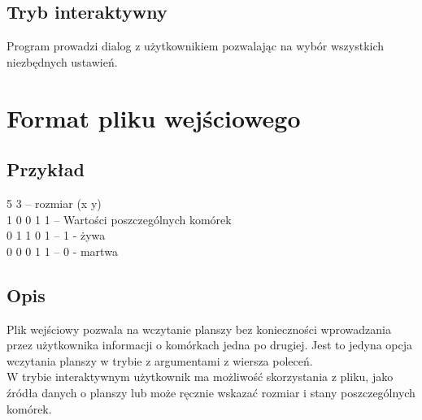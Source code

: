 \documentclass{report}
\begin{document}
\subsection{Tryb interaktywny}
Program prowadzi dialog z użytkownikiem pozwalając na wybór wszystkich niezbędnych ustawień.

\section{Format pliku wejściowego}  \label{format}
\subsection*{Przykład}
5 3 \tab -- rozmiar (x y) \\
1 0 0 1 1 \tab -- Wartości poszczególnych komórek \\
0 1 1 0 1 \tab -- 1 - żywa \\
0 0 0 1 1 \tab -- 0 - martwa \\

\subsection*{Opis} 
Plik wejściowy pozwala na wczytanie planszy bez konieczności wprowadzania przez użytkownika informacji o komórkach jedna po drugiej.
Jest to jedyna opcja wczytania planszy w trybie z argumentami z wiersza poleceń. \\
W trybie interaktywnym użytkownik ma możliwość skorzystania z pliku, jako źródła danych o planszy lub może ręcznie wskazać rozmiar i stany poszczególnych komórek.
\end{document}
